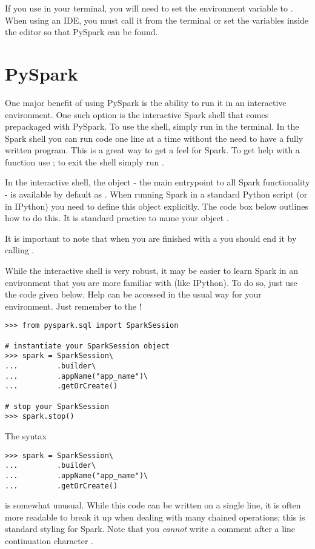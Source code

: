 If you use  in your terminal, you will need to set the  environment variable to .
When using an IDE, you must call it from the terminal or set the variables inside the editor so that PySpark can be found.


\section*{PySpark} %
One major benefit of using PySpark is the ability to run it in an interactive environment. 
One such option is the interactive Spark shell that comes prepackaged with PySpark. 
To use the shell, simply run  in the terminal. 
In the Spark shell you can run code one line at a time without the need to have a fully written program. This is a great way to get a feel for Spark. 
To get help with a function use ; to exit the shell simply run .

In the interactive shell, the  object - the main entrypoint to all Spark functionality - is available by default as . 
When running Spark in a standard Python script (or in IPython) you need to define this object explicitly. The code box below outlines how to do this. 
It is standard practice to name your  object .

It is important to note that when you are finished with a  you should end it by calling .

\begin{info}
While the interactive shell is very robust, it may be easier to learn Spark in an environment that you are more familiar with (like IPython). 
To do so, just use the code given below. Help can be accessed in the usual way for your environment. 
Just remember to  the !
\end{info}

\begin{lstlisting}
>>> from pyspark.sql import SparkSession

# instantiate your SparkSession object
>>> spark = SparkSession\
...			.builder\
...			.appName("app_name")\
...			.getOrCreate()

# stop your SparkSession
>>> spark.stop()
\end{lstlisting}

\begin{info}
The syntax
\begin{lstlisting}
>>> spark = SparkSession\
...			.builder\
...			.appName("app_name")\
...			.getOrCreate()
\end{lstlisting}
is somewhat unusual. 
While this code can be written on a single line, it is often more readable to break it up when dealing with many chained operations; this is standard styling for Spark. 
Note that you \textit{cannot} write a comment after a line continuation character .
\end{info}


